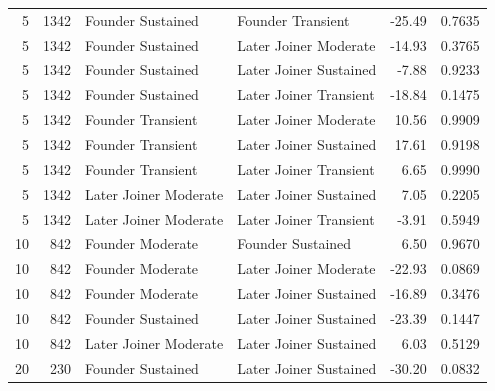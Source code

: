 \begin{table}[H]
\begin{tabular}{r r l l r r}
5 & 1342 & Founder Sustained & Founder Transient & -25.49 & 0.7635 \\ 
5 & 1342 & Founder Sustained & Later Joiner Moderate & -14.93 & 0.3765 \\ 
5 & 1342 & Founder Sustained & Later Joiner Sustained & -7.88 & 0.9233 \\ 
5 & 1342 & Founder Sustained & Later Joiner Transient & -18.84 & 0.1475 \\ 
5 & 1342 & Founder Transient & Later Joiner Moderate & 10.56 & 0.9909 \\ 
5 & 1342 & Founder Transient & Later Joiner Sustained & 17.61 & 0.9198 \\ 
5 & 1342 & Founder Transient & Later Joiner Transient & 6.65 & 0.9990 \\ 
5 & 1342 & Later Joiner Moderate & Later Joiner Sustained & 7.05 & 0.2205 \\ 
5 & 1342 & Later Joiner Moderate & Later Joiner Transient & -3.91 & 0.5949 \\ 
10 & 842 & Founder Moderate & Founder Sustained & 6.50 & 0.9670 \\ 
10 & 842 & Founder Moderate & Later Joiner Moderate & -22.93 & 0.0869 \\ 
10 & 842 & Founder Moderate & Later Joiner Sustained & -16.89 & 0.3476 \\ 
10 & 842 & Founder Sustained & Later Joiner Sustained & -23.39 & 0.1447 \\ 
10 & 842 & Later Joiner Moderate & Later Joiner Sustained & 6.03 & 0.5129 \\ 
20 & 230 & Founder Sustained & Later Joiner Sustained & -30.20 & 0.0832 \\ 
\bottomrule
\end{tabular}%
\label{tab:codebase_graph_latex_repository_graph_component_time_series_tukey_hsdnon_sigclasses} 
\end{table}
\newpage 
